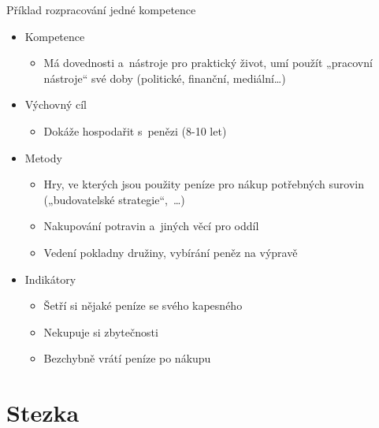 \documentclass[compress,xelatex,xcolor=dvipsnames,print]{beamer}
\begin{document}
\begin{frame}{Příklad rozpracování jedné kompetence}
\begin{itemize}
\item Kompetence
 \begin{itemize}
 \item Má dovednosti a~nástroje pro praktický život, umí použít „pracovní nástroje“ své doby (politické, finanční, mediální\ldots)
 \end{itemize}
\item Výchovný cíl
 \begin{itemize}
 \item Dokáže hospodařit s~penězi (8-10 let)
 \end{itemize}
\item Metody
 \begin{itemize}
 \item Hry, ve kterých jsou použity peníze pro nákup potřebných surovin („budovatelské strategie“,~\ldots)
 \item Nakupování potravin a~jiných věcí pro oddíl
 \item Vedení pokladny družiny, vybírání peněz na výpravě
 \end{itemize}
\item Indikátory
\begin{itemize}
 \item Šetří si nějaké peníze se svého kapesného
 \item Nekupuje si zbytečnosti
 \item Bezchybně vrátí peníze po nákupu
\end{itemize}
\end{itemize}
\end{frame}

\section{Stezka}
\end{document}
